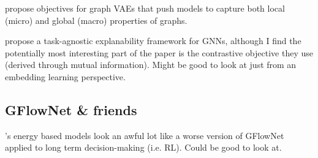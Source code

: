 \citet{zahirnia2022micro} propose objectives for graph VAEs that push models to capture both local (micro) and global (macro) properties of graphs.

\citet{xie2022taskagnostic} propose a task-agnostic explanability framework for GNNs, although I find the potentially most interesting part of the paper is the contrastive objective they use (derived through mutual information). Might be good to look at just from an embedding learning perspective.

\subsection{GFlowNet & friends}

\citet{kong2022endtoend}'s energy based models look an awful lot like a worse version of GFlowNet applied to long term decision-making (i.e. RL). Could be good to look at.
